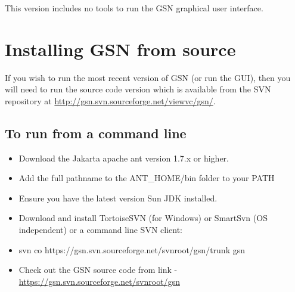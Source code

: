 This version includes no tools to run the GSN graphical user interface.

\section{Installing GSN from source}

If you wish to run the most recent version of GSN (or run the GUI), then you will need to run the source code version which is available from the SVN repository at \url{http://gsn.svn.sourceforge.net/viewvc/gsn/}.

\subsection{To run from a command line}

\begin{itemize}
	\item Download the Jakarta apache ant version 1.7.x or higher.
	\item Add the full pathname to the ANT\_HOME/bin folder to your PATH
	\item Ensure you have the latest version Sun JDK installed.
	\item Download and install TortoiseSVN (for Windows) or SmartSvn (OS
independent) or a command line SVN client:
	\item svn co https://gsn.svn.sourceforge.net/svnroot/gsn/trunk gsn
	\item Check out the GSN source code from link -
\url{https://gsn.svn.sourceforge.net/svnroot/gsn}
\end{itemize}

